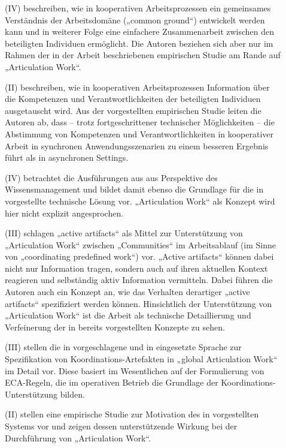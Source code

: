 \begin{description}
	\item[\citet{Convertino08}] (IV) beschreiben, wie in kooperativen Arbeitsprozessen ein gemeinsames Verständnis der Arbeitsdomäne („common ground“) entwickelt werden kann und in weiterer Folge eine einfachere Zusammenarbeit zwischen den beteiligten Individuen ermöglicht. Die Autoren beziehen sich aber nur im Rahmen der in der Arbeit beschriebenen empirischen Studie am Rande auf „Articulation Work“.
	\item[\citet{Larsen08}] (II) beschreiben, wie in kooperativen Arbeitsprozessen Information über die Kompetenzen und Verantwortlichkeiten der beteiligten Individuen ausgetauscht wird. Aus der vorgestellten empirischen Studie leiten die Autoren ab, dass -- trotz fortgeschrittener technischer Möglichkeiten -- die Abstimmung von Kompetenzen und Verantwortlichkeiten in kooperativer Arbeit in synchronen Anwendungsszenarien zu einem besseren Ergebnis führt als in asynchronen Settings.
	\item[\citet{Cabitza08}] (IV) betrachtet die Ausführungen aus \citet{Cabitza07} aus Perspektive des Wissensmanagement und bildet damit ebenso die Grundlage für die in \citep{Cabitza09} vorgestellte technische Lösung vor. „Articulation Work“ als Konzept wird hier nicht explizit angesprochen.
	\item[\citet{Cabitza09}] (III) schlagen „active artifacts“ als Mittel zur Unterstützung von „Articulation Work“ zwischen „Communities“ im Arbeitsablauf (im Sinne von „coordinating predefined work“) vor. „Active artifacts“ können dabei nicht nur Information tragen, sondern auch auf ihren aktuellen Kontext reagieren und selbständig aktiv Information vermitteln. Dabei führen die Autoren auch ein Konzept an, wie das Verhalten derartiger „active artifacts“ spezifiziert werden können. Hinsichtlich der Unterstützung von „Articulation Work“ ist die Arbeit als technische Detaillierung und Verfeinerung der in \citet{Cabitza06} bereits vorgestellten Konzepte zu sehen.
	\item[\citet{Cabitza09a}] (III) stellen die in \citet{Cabitza06} vorgeschlagene und in \citep{Cabitza09} eingesetzte Sprache zur Spezifikation von Koordinations-Artefakten in „global Articulation Work“ im Detail vor. Diese basiert im Wesentlichen auf der Formulierung von \gls{ECA}-Regeln, die im operativen Betrieb die Grundlage der Koordinations-Unterstützung bilden.
	\item[\citet{Cabitza09b}] (II) stellen eine empirische Studie zur Motivation des in \citep{Cabitza09} vorgestellten Systems vor und zeigen dessen unterstützende Wirkung bei der Durchführung von „Articulation Work“.
\end{description}


